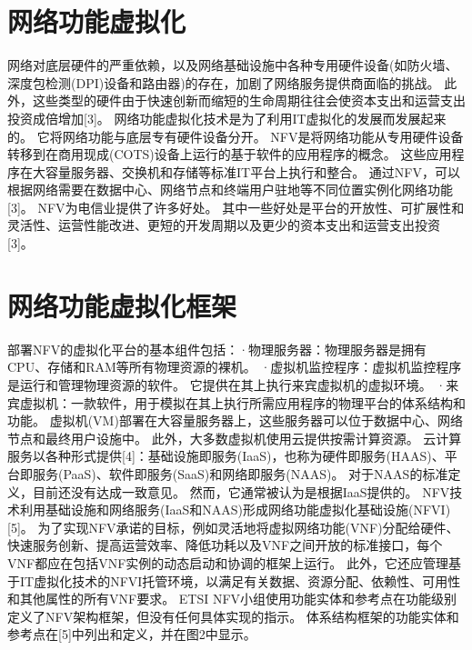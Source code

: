 \chapter{网络功能虚拟化}
网络对底层硬件的严重依赖，以及网络基础设施中各种专用硬件设备(如防火墙、深度包检测(DPI)设备和路由器)的存在，加剧了网络服务提供商面临的挑战。
此外，这些类型的硬件由于快速创新而缩短的生命周期往往会使资本支出和运营支出投资成倍增加[3]。
网络功能虚拟化技术是为了利用IT虚拟化的发展而发展起来的。
它将网络功能与底层专有硬件设备分开。
NFV是将网络功能从专用硬件设备转移到在商用现成(COTS)设备上运行的基于软件的应用程序的概念。
这些应用程序在大容量服务器、交换机和存储等标准IT平台上执行和整合。
通过NFV，可以根据网络需要在数据中心、网络节点和终端用户驻地等不同位置实例化网络功能[3]。
NFV为电信业提供了许多好处。
其中一些好处是平台的开放性、可扩展性和灵活性、运营性能改进、更短的开发周期以及更少的资本支出和运营支出投资[3]。

\chapter{网络功能虚拟化框架}
部署NFV的虚拟化平台的基本组件包括：·物理服务器：物理服务器是拥有CPU、存储和RAM等所有物理资源的裸机。
·虚拟机监控程序：虚拟机监控程序是运行和管理物理资源的软件。
它提供在其上执行来宾虚拟机的虚拟环境。
·来宾虚拟机：一款软件，用于模拟在其上执行所需应用程序的物理平台的体系结构和功能。
虚拟机(VM)部署在大容量服务器上，这些服务器可以位于数据中心、网络节点和最终用户设施中。
此外，大多数虚拟机使用云提供按需计算资源。
云计算服务以各种形式提供[4]：基础设施即服务(IaaS)，也称为硬件即服务(HAAS)、平台即服务(PaaS)、软件即服务(SaaS)和网络即服务(NAAS)。
对于NAAS的标准定义，目前还没有达成一致意见。
然而，它通常被认为是根据IaaS提供的。
NFV技术利用基础设施和网络服务(IaaS和NAAS)形成网络功能虚拟化基础设施(NFVI)[5]。
为了实现NFV承诺的目标，例如灵活地将虚拟网络功能(VNF)分配给硬件、快速服务创新、提高运营效率、降低功耗以及VNF之间开放的标准接口，每个VNF都应在包括VNF实例的动态启动和协调的框架上运行。
此外，它还应管理基于IT虚拟化技术的NFVI托管环境，以满足有关数据、资源分配、依赖性、可用性和其他属性的所有VNF要求。
ETSI NFV小组使用功能实体和参考点在功能级别定义了NFV架构框架，但没有任何具体实现的指示。
体系结构框架的功能实体和参考点在[5]中列出和定义，并在图2中显示。


